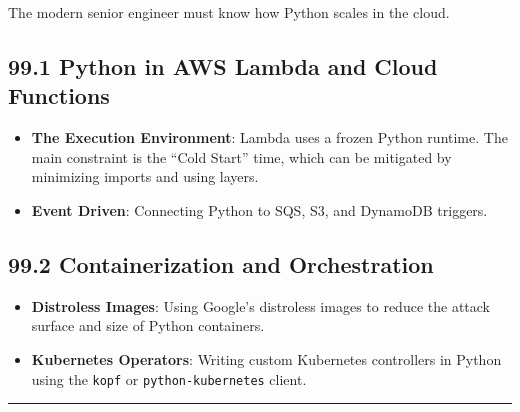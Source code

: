 The modern senior engineer must know how Python scales in the cloud.

\hypertarget{python-in-aws-lambda-and-cloud-functions}{%
\subsection{99.1 Python in AWS Lambda and Cloud
Functions}\label{python-in-aws-lambda-and-cloud-functions}}

\begin{itemize}
\tightlist
\item
  \textbf{The Execution Environment}: Lambda uses a frozen Python
  runtime. The main constraint is the ``Cold Start'' time, which can be
  mitigated by minimizing imports and using layers.
\item
  \textbf{Event Driven}: Connecting Python to SQS, S3, and DynamoDB
  triggers.
\end{itemize}

\hypertarget{containerization-and-orchestration}{%
\subsection{99.2 Containerization and
Orchestration}\label{containerization-and-orchestration}}

\begin{itemize}
\tightlist
\item
  \textbf{Distroless Images}: Using Google's distroless images to reduce
  the attack surface and size of Python containers.
\item
  \textbf{Kubernetes Operators}: Writing custom Kubernetes controllers
  in Python using the \passthrough{\lstinline!kopf!} or
  \passthrough{\lstinline!python-kubernetes!} client.
\end{itemize}

\begin{center}\rule{0.5\linewidth}{0.5pt}\end{center}
